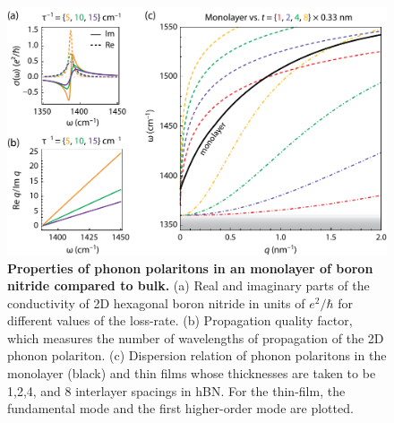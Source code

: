 \documentclass[aps,prb,twocolumn,
	           groupedaddress,superscriptaddress,
               amsfonts,amssymb,amsmath,floatfix,
	           citeautoscript]{revtex4-1}
\begin{document}
\begin{figure}[t]
    \includegraphics[width=135mm]{figure2hBN.pdf}
    \caption{%
        \textbf{Properties of phonon polaritons in an monolayer of boron nitride compared to bulk.} (a) Real and imaginary parts of the conductivity of 2D hexagonal boron nitride in units of $e^2/\hbar$ for different values of the loss-rate. (b) Propagation quality factor, which measures the number of wavelengths of propagation of the 2D phonon polariton. (c) Dispersion relation of phonon polaritons in the monolayer (black) and thin films whose thicknesses are taken to be 1,2,4, and 8 interlayer spacings in hBN. For the thin-film, the fundamental mode and the first higher-order mode are plotted. 
        \label{fig:2}
        }
\end{figure}
\end{document}
